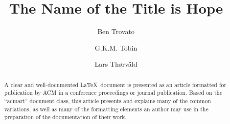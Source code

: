 \documentclass[sigconf]{acmart}
\begin{document}
\title{The Name of the Title is Hope}

\author{Ben Trovato}
\author{G.K.M. Tobin}
\authornotemark[1]

\author{Lars Th{\o}rv{\"a}ld}


\begin{abstract}
  A clear and well-documented \LaTeX\ document is presented as an
  article formatted for publication by ACM in a conference proceedings
  or journal publication. Based on the ``acmart'' document class, this
  article presents and explains many of the common variations, as well
  as many of the formatting elements an author may use in the
  preparation of the documentation of their work.
\end{abstract}

\end{document}
